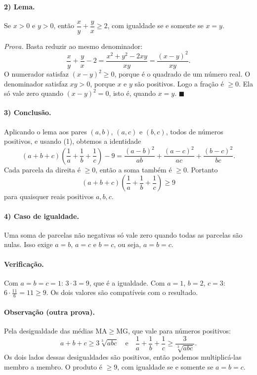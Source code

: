 \documentclass{article}%
\begin{document}
\paragraph{2) Lema.} Se $x>0$ e $y>0$, então $\dfrac xy+\dfrac yx\ge 2$, com igualdade se e somente se $x=y$.

\emph{Prova.} Basta reduzir ao mesmo denominador:
\[
\frac xy+\frac yx-2=\frac{x^2+y^2-2xy}{xy}=\frac{(x-y)^2}{xy}.
\]
O numerador satisfaz $(x-y)^2\ge 0$, porque é o quadrado de um número real. O denominador satisfaz $xy>0$, porque $x$ e $y$ são positivos. Logo a fração é $\ge 0$. Ela só vale zero quando $(x-y)^2=0$, isto é, quando $x=y$. $\blacksquare$

\paragraph{3) Conclusão.} Aplicando o lema aos pares $(a,b)$, $(a,c)$ e $(b,c)$, todos de números positivos, e usando (1), obtemos a identidade
\[
(a+b+c)\left(\frac1a+\frac1b+\frac1c\right)-9
=\frac{(a-b)^2}{ab}+\frac{(a-c)^2}{ac}+\frac{(b-c)^2}{bc}.
\]
Cada parcela da direita é $\ge 0$, então a soma também é $\ge 0$. Portanto
\[
\boxed{(a+b+c)\left(\frac1a+\frac1b+\frac1c\right)\ge 9}
\]
para quaisquer reais positivos $a,b,c$.

\paragraph{4) Caso de igualdade.} Uma soma de parcelas não negativas só vale zero quando todas as parcelas são nulas. Isso exige $a=b$, $a=c$ e $b=c$, ou seja, $a=b=c$.

\paragraph{Verificação.} Com $a=b=c=1$: $3\cdot 3=9$, que é a igualdade. Com $a=1$, $b=2$, $c=3$: $6\cdot\frac{11}{6}=11\ge 9$. Os dois valores são compatíveis com o resultado.

\paragraph{Observação (outra prova).} Pela desigualdade das médias $\mathrm{MA}\ge\mathrm{MG}$, que vale para números positivos:
\[
a+b+c\ge 3\sqrt[3]{abc}
\quad\text{e}\quad
\frac1a+\frac1b+\frac1c\ge \frac{3}{\sqrt[3]{abc}}.
\]
Os dois lados dessas desigualdades são positivos, então podemos multiplicá-las membro a membro. O produto é $\ge 9$, com igualdade se e somente se $a=b=c$.
\end{document}
